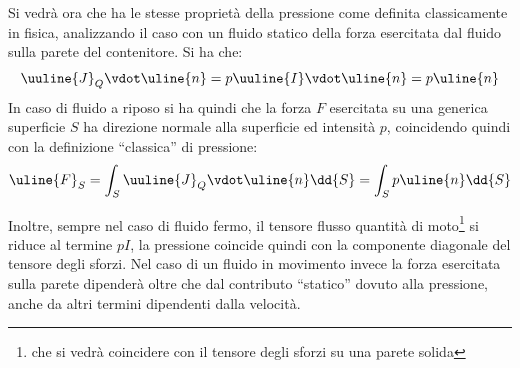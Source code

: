 Si vedrà ora che ha le stesse proprietà della pressione come definita classicamente in fisica, analizzando il caso con un fluido statico della forza esercitata dal fluido sulla parete del contenitore. Si ha che:
	\begin{equation*}
		\uuline{J}_Q \vdot \uline{n} = p \uuline{I} \vdot \uline{n} = p \uline{n}
	\end{equation*} 
In caso di fluido a riposo si ha quindi che la forza $F$ esercitata su una generica superficie $S$ ha direzione normale alla superficie ed intensità $p$, coincidendo quindi con la definizione ``classica'' di pressione:
	\begin{equation*}
		\uline{F}_S = \int_S {\uuline{J}}_Q \vdot \uline{n} \dd{S} = \int_S p \uline{n} \dd{S}
	\end{equation*}

Inoltre, sempre nel caso di fluido fermo, il tensore flusso quantità di moto\footnote{che si vedrà coincidere con il tensore degli sforzi su una parete solida} si riduce al termine $pI$,  la pressione coincide quindi con la componente diagonale del tensore degli sforzi.
Nel caso di un fluido in movimento invece la forza esercitata sulla parete dipenderà oltre che dal contributo ``statico'' dovuto alla pressione, anche da altri termini dipendenti dalla velocità.

